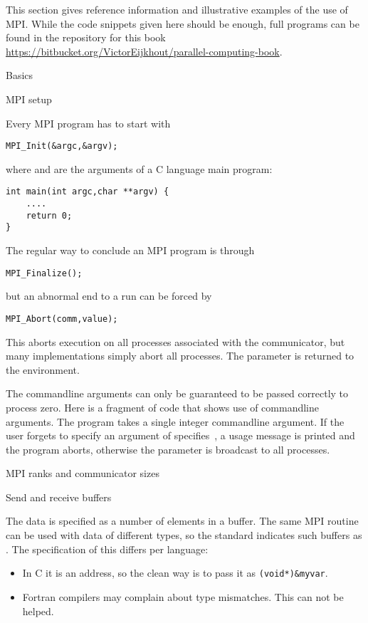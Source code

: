 This section gives reference information and illustrative examples
of the use of MPI. While the code snippets given here should be enough,
full programs can be found in the repository for this book
\url{https://bitbucket.org/VictorEijkhout/parallel-computing-book}.

 {Basics}

 {MPI setup}

Every MPI program has to start with
\begin{verbatim}
MPI_Init(&argc,&argv);
\end{verbatim}
where  and  are the arguments
of a C language main program:
\begin{verbatim}
int main(int argc,char **argv) {
    ....
    return 0;
}
\end{verbatim}
The regular way to conclude an MPI program is through
\begin{verbatim}
MPI_Finalize();
\end{verbatim}
but an abnormal end to a run can be forced by
\begin{verbatim}
MPI_Abort(comm,value);
\end{verbatim}
This aborts execution on all processes associated with the communicator,
but many implementations simply abort all processes. The  parameter
is returned to the environment.

The commandline arguments can only be guaranteed to be passed correctly to 
process zero. Here is a fragment of code that shows use of commandline arguments.
The program  takes a single integer commandline argument.
If the user forgets to specify an argument of specifies~, a usage message
is printed and the program aborts, otherwise the parameter is broadcast to 
all processes.

 {MPI ranks and communicator sizes}

 {Send and receive buffers}

The data is specified as a number of elements in a buffer. The same
MPI routine can be used with data of different types, so the standard
indicates such buffers as . The specification of
this differs per language:
\begin{itemize}
\item In C it is an address, so the clean way is to pass it as
  \verb+(void*)&myvar+.
\item Fortran compilers may complain about type mismatches. This can
  not be helped.
\end{itemize}

